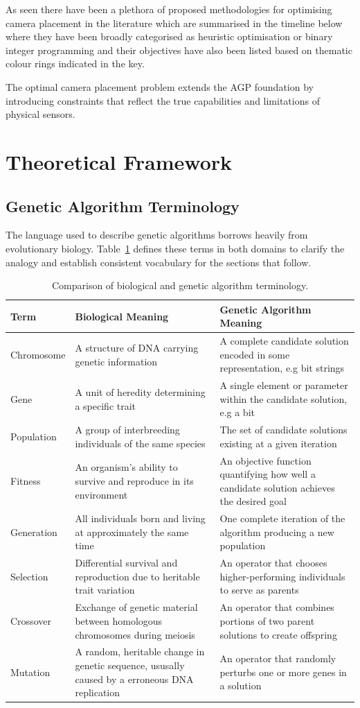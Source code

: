 As seen there have been a plethora of proposed methodologies for optimising camera placement in the literature which are summarised in the timeline below where they have been broadly categorised as heuristic optimisation or binary integer programming and their objectives have also been listed based on thematic colour rings indicated in the key. 

The optimal camera placement problem extends the \gls{AGP} foundation by introducing constraints that reflect the true capabilities and limitations of physical sensors.

\section{Theoretical Framework}
\subsection{Genetic Algorithm Terminology}
The language used to describe genetic algorithms borrows heavily from evolutionary biology. Table~\ref{tab:ga-terminology} defines these terms in both domains to clarify the analogy and establish consistent vocabulary for the sections that follow.

\begin{table}[h]
\centering
\caption{Comparison of biological and genetic algorithm terminology.}
\begin{tabularx}{\textwidth}{l X X}
\toprule 
Term & Biological Meaning & Genetic Algorithm Meaning \\
\midrule 
Chromosome & A structure of \gls{DNA} carrying genetic information & A complete candidate solution encoded in some representation, e.g bit strings \\
Gene & A unit of heredity determining a specific trait & A single element or parameter within the candidate solution, e.g a bit \\
Population & A group of interbreeding individuals of the same species & The set of candidate solutions existing at a given iteration \\
Fitness & An organism's ability to survive and reproduce in its environment & An objective function quantifying how well a candidate solution achieves the desired goal \\
Generation & All individuals born and living at approximately the same time & One complete iteration of the algorithm producing a new population \\
Selection & Differential survival and reproduction due to heritable trait variation & An operator that chooses higher-performing individuals to serve as parents \\
Crossover & Exchange of genetic material between homologous chromosomes during meiosis & An operator that combines portions of two parent solutions to create offspring \\
Mutation & A random, heritable change in genetic sequence, ususally caused by a erroneous \gls{DNA} replication & An operator that randomly perturbs one or more genes in a solution \\
\bottomrule
\end{tabularx}
\label{tab:ga-terminology}
\end{table}

